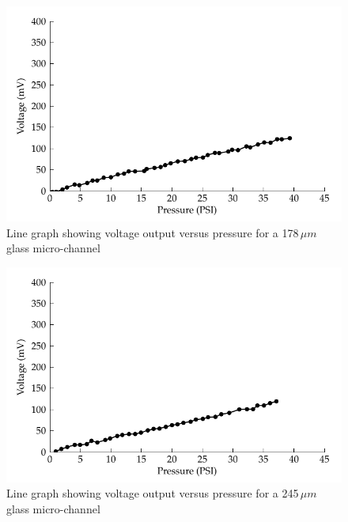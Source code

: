 \begin{figure}
\begin{centering}
\includegraphics{content/appendices/streamingCellMeasurements/graphics/streamingCell_voltVsPress_178um_out}
\par\end{centering}

\protect\caption{Line graph showing voltage output versus pressure for a 178$\,\mu m$
glass micro-channel}
\end{figure}
\begin{figure}
\begin{centering}
\includegraphics{content/appendices/streamingCellMeasurements/graphics/streamingCell_voltVsPress_245um_out}
\par\end{centering}

\protect\caption{Line graph showing voltage output versus pressure for a 245$\,\mu m$
glass micro-channel}
\end{figure}


